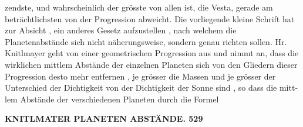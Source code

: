 \documentclass[12pt,a4paper]{article}
\begin{document}
zendste, und  wahrscheinlich  der  grösste  von  allen  ist,  die  Vesta,  gerade  am  beträchtlichsten  von  der Progression  abweicht. Die  vorliegende  kleine  Schrift  hat  zur  Absicht ,  ein  anderes  Gesetz  aufzustellen ,  nach  welchem die  Planetenabstände  sich  nicht  näherungsweise,  sondern  genau  richten  sollen.  Hr.  Knitlmayer  geht von  einer  geometrischen  Progression  aus  und  nimmt  an,  dass  die  wirklichen  mittlem  Abstände  der einzelnen  Planeten  sich  von  den  Gliedern  dieser  Progression  desto  mehr  entfernen ,  je  grösser  die  Massen und  je  grösser  der  Unterschied  der  Dichtigkeit  von  der  Dichtigkeit  der  Sonne  sind ,  so  dass  die  mitt- lem Abstände  der  verschiedenen  Planeten  durch  die  Formel

\vspace{0.5em}


\noindent\textbf{KNITLMATER      PLANETEN  ABSTÄNDE.  529}
\end{document}
